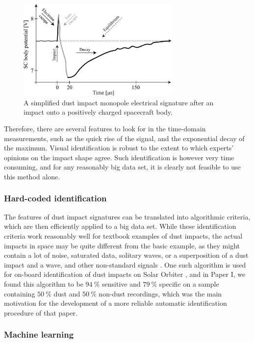 \begin{figure}[h]
 	\centering
 	\includegraphics[width=8cm]{figures/impact_wf_gs.pdf}
 	\caption{A simplified dust impact monopole electrical signature after an impact onto a positively charged spacecraft body.}
 	\label{fig:impact_process}
\end{figure}

Therefore, there are several features to look for in the time-domain measurements, such as the quick rise of the signal, and the exponential decay of the maximum. Visual identification is robust to the extent to which experts' opinions on the impact shape agree. Such identification is however very time consuming, and for any reasonably big data set, it is clearly not feasible to use this method alone.

\subsubsection{Hard-coded identification}

The features of dust impact signatures can be translated into algorithmic criteria, which are then efficiently applied to a big data set. While these identification criteria work reasonably well for textbook examples of dust impacts, the actual impacts in space may be quite different from the basic example, as they might contain a lot of noise, saturated data, solitary waves, or a superposition of a dust impact and a wave, and other non-standard signals \citep{vaverka2018comparison,ye2019understanding,malaspina2023dust}. One such algorithm is used for on-board identification of dust impacts on Solar Orbiter \cite{maksimovic2020solar}, and in Paper I, we found this algorithm to be $\SI{94}{\%}$ sensitive and $\SI{79}{\%}$ specific on a sample containing $\SI{50}{\%}$ dust and $\SI{50}{\%}$ non-dust recordings, which was the main motivation for the development of a more reliable automatic identification procedure of that paper. 

\subsubsection{Machine learning}

